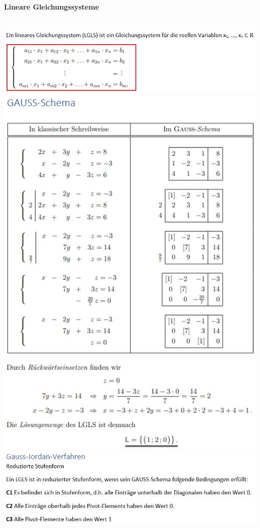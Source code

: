 \paragraph{Lineare Gleichungssysteme}\mbox{}\\
\noindent
\includegraphics[width=\columnwidth]{./images/lgs1.png}
\includegraphics[width=\columnwidth]{./images/lgs2.png}
\includegraphics[width=\columnwidth]{./images/lgs3.png}
\includegraphics[width=\columnwidth]{./images/lgs4.png}
